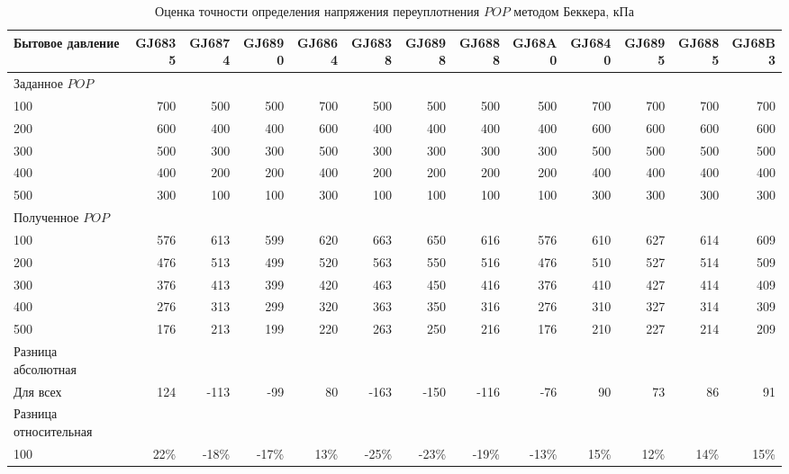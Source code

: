 \begin{sidewaystable}[p]
    \centering
    \small
    \caption{Оценка точности определения напряжения переуплотнения $POP$ методом Беккера, кПа} \label{tab:pop-beck}
    \begin{tabular}{@{}lrrrrrrrrrrrr@{}}
    \toprule
    Бытовое давление & GJ6835 & GJ6874 & GJ6890 & GJ6864 & GJ6838 & GJ6898 & GJ6888 & GJ68A0 & GJ6840 & GJ6895 & GJ6885 & GJ68B3 \\
    \midrule
    Заданное $POP$ &  &  &  &  &  &  &  &  &  &  &  &  \\
    100 & 700 & 500 & 500 & 700 & 500 & 500 & 500 & 500 & 700 & 700 & 700 & 700 \\
    200 & 600 & 400 & 400 & 600 & 400 & 400 & 400 & 400 & 600 & 600 & 600 & 600 \\
    300 & 500 & 300 & 300 & 500 & 300 & 300 & 300 & 300 & 500 & 500 & 500 & 500 \\
    400 & 400 & 200 & 200 & 400 & 200 & 200 & 200 & 200 & 400 & 400 & 400 & 400 \\
    500 & 300 & 100 & 100 & 300 & 100 & 100 & 100 & 100 & 300 & 300 & 300 & 300 \\
    \midrule
    Полученное $POP$ &  &  &  &  &  &  &  &  &  &  &  &  \\
    100 & 576 & 613 & 599 & 620 & 663 & 650 & 616 & 576 & 610 & 627 & 614 & 609 \\
    200 & 476 & 513 & 499 & 520 & 563 & 550 & 516 & 476 & 510 & 527 & 514 & 509 \\
    300 & 376 & 413 & 399 & 420 & 463 & 450 & 416 & 376 & 410 & 427 & 414 & 409 \\
    400 & 276 & 313 & 299 & 320 & 363 & 350 & 316 & 276 & 310 & 327 & 314 & 309 \\
    500 & 176 & 213 & 199 & 220 & 263 & 250 & 216 & 176 & 210 & 227 & 214 & 209 \\
    \midrule
    Разница абсолютная &  &  &  &  &  &  &  &  &  &  &  &  \\
    Для всех & 124 & -113 & -99 & 80 & -163 & -150 & -116 & -76 & 90 & 73 & 86 & 91 \\
    \midrule
    Разница относительная &  &  &  &  &  &  &  &  &  &  &  &  \\
    100 & 22\% & -18\% & -17\% & 13\% & -25\% & -23\% & -19\% & -13\% & 15\% & 12\% & 14\% & 15\% \\

\end{tabular}
\end{sidewaystable}
